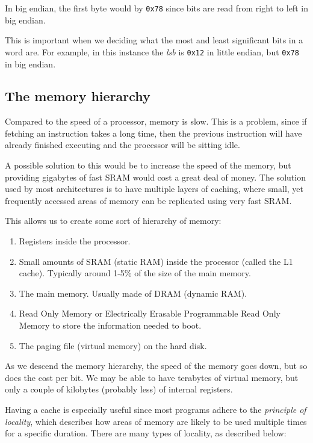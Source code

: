 In big endian, the first byte would by {\tt 0x78} since bits are read from right
to left in big endian.

This is important when we deciding what the most and least significant bits in a
word are. For example, in this instance the {\it lsb} is {\tt 0x12} in little
endian, but {\tt 0x78} in big endian.

\subsection{The memory hierarchy}

Compared to the speed of a processor, memory is slow. This is a problem, since
if fetching an instruction takes a long time, then the previous instruction will
have already finished executing and the processor will be sitting idle.

A possible solution to this would be to increase the speed of the memory, but
providing gigabytes of fast SRAM would cost a great deal of money. The solution
used by most architectures is to have multiple layers of caching, where small,
yet frequently accessed areas of memory can be replicated using very fast SRAM.

This allows us to create some sort of hierarchy of memory:

\begin{enumerate}
	\item Registers inside the processor.
	\item Small amounts of SRAM (static RAM) inside the processor (called the L1
	cache). Typically around 1-5\% of the size of the main memory.
	\item The main memory. Usually made of DRAM (dynamic RAM).
	\item Read Only Memory or Electrically Erasable Programmable Read Only Memory
	to store the information needed to boot.\
	\item The paging file (virtual memory) on the hard disk.
\end{enumerate}

As we descend the memory hierarchy, the speed of the memory goes down, but so
does the cost per bit. We may be able to have terabytes of virtual memory, but
only a couple of kilobytes (probably less) of internal registers.

Having a cache is especially useful since most programs adhere to the {\it
principle of locality}, which describes how areas of memory are likely to be
used multiple times for a specific duration. There are many types of locality,
as described below:

